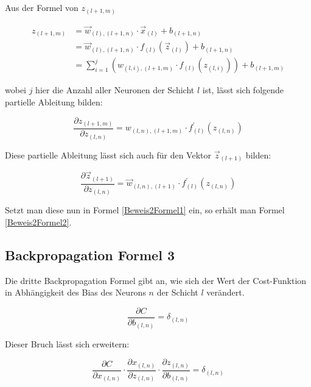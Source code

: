 \documentclass[a4paper,12pt,ngerman,oneside]{scrreprt}	%
\begin{document}
			Aus der Formel von $z_{(l+1,m)}$
		
			\begin{equation}
			\begin{split}
				z_{(l+1,m)} & = \vec{w}_{(l),(l+1,n)} \cdot \vec{x}_{(l)} + b_{(l+1,n)} \\
				&= \vec{w}_{(l),(l+1,n)} \cdot f_{(l)}(\vec{z}_{(l)}) + b_{(l+1,n)} \\
				&= \sum_{i=1}^{j}(w_{(l,i),(l+1,m)} \cdot f_{(l)}(z_{(l,i)})) + b_{(l+1,m)}
			\end{split}
			\end{equation}
			
			wobei $j$ hier die Anzahl aller Neuronen der Schicht $l$ ist, lässt sich folgende partielle Ableitung bilden:
			
			\begin{equation}
				\frac{\partial z_{(l+1,m)}}{\partial z_{(l,n)}} = w_{(l,n),(l+1,m)} \cdot f_{(l)}^{\prime} (z_{(l,n)})
			\end{equation}
			
			Diese partielle Ableitung lässt sich auch für den Vektor $\vec{z}_{(l+1)}$ bilden:
			
			\begin{equation}
				\frac{\partial \vec{z}_{(l+1)}}{\partial z_{(l,n)}} = \vec{w}_{(l,n),(l+1)} \cdot f_{(l)}^{\prime}(z_{(l,n)})
			\end{equation}
			
			Setzt man diese nun in Formel \ref{Beweis2Formel1} ein, so erhält man Formel \ref{Beweis2Formel2}.

			
			
			\subsection*{Backpropagation Formel 3}
			Die dritte Backpropagation Formel gibt an, wie sich der Wert der Cost-Funktion in Abhängigkeit des Bias des Neurons $n$ der Schicht $l$ verändert.
			
			\begin{equation}\label{Beweis3Formel1}
				\frac{\partial C}{\partial b_{(l,n)}} = \delta_{(l,n)}
			\end{equation}
			
			Dieser Bruch lässt sich erweitern:
			
			\begin{equation}
				\frac{\partial C}{\partial x_{(l,n)}} \cdot \frac{\partial x_{(l,n)}}{\partial z_{(l,n)}} \cdot \frac{\partial z_{(l,n)}}{\partial b_{(l,n)}} = \delta_{(l,n)}
			\end{equation}
			
\end{document}

